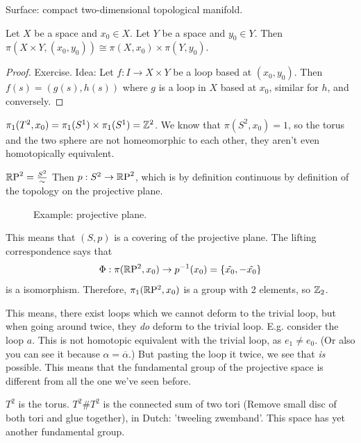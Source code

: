 \begin{definition}[Surface]
    Surface: compact two-dimensional topological manifold.
\end{definition}
\begin{theorem}
    Let $X$ be a space and $x_0 \in X$.
    Let $Y$ be a space and $y_0 \in Y$.
    Then $\pi(X\times Y, (x_0, y_0)) \cong \pi(X, x_0) \times  \pi(Y, y_0)$.
\end{theorem}
\begin{proof}
    Exercise. Idea:
    Let $f: I \to X \times Y$ be a loop based at $(x_0, y_0)$. 
    Then $f(s) = (g(s), h(s))$ where  $g$ is a loop in $X$ based at $x_0$, similar for $h$,
    and conversely.
\end{proof}
\begin{eg}
    $\pi_1(T^2, x_0) = \pi_1(S^1) \times \pi_1(S^1) = \mathbb{Z}^2$.
    We know that $\pi(S^2, x_0) = 1$, so the torus and the two sphere are not homeomorphic to each other, they aren't even homotopically equivalent.
\end{eg}
\begin{eg}
    $\mathbb{R}\text{P}^2 = \frac{S^2}{\sim }$ 
    Then $p: S^2 \to \mathbb{R}\text{P}^2$, which is by definition continuous by definition of the topology on the projective plane.

\begin{figure}[H]
    \centering
    \caption{Example: projective plane.}
    \label{fig:projective-plane-example}
\end{figure}
This means that $(S, p)$ is a covering of the projective plane.
The lifting correspondence says that
\[
    \Phi: \pi(\mathbb{R} \mathrm P^2, x_0) \to p^{-1}(x_0) = \{ \tilde{x_0}, -\tilde{x_0}\} 
\] 
is a isomorphism.
Therefore, $\pi_1(\mathbb{R} \mathrm P^2, x_0)$ is a group with 2 elements, so $\mathbb{Z}_2$.

This means, there exist loops which we cannot deform to the trivial loop, but when going around twice, they \emph{do} deform to the trivial loop.
E.g. consider the loop $a$. This is not homotopic equivalent with the trivial loop, as $e_1 \neq e_0$. (Or also you can see it because $\alpha = \overline{\alpha}$.)
But pasting the loop it twice, we see that \emph{is} possible.
This means that the fundamental group of the projective space is different from all the one we've seen before.
\end{eg}

\begin{eg}
    $T^2$ is the torus.
    $T^2 \# T^2$ is the connected sum of two tori (Remove small disc of both tori and glue together), in Dutch: 'tweeling zwemband'. 
    This space has yet another fundamental group.
\end{eg}

